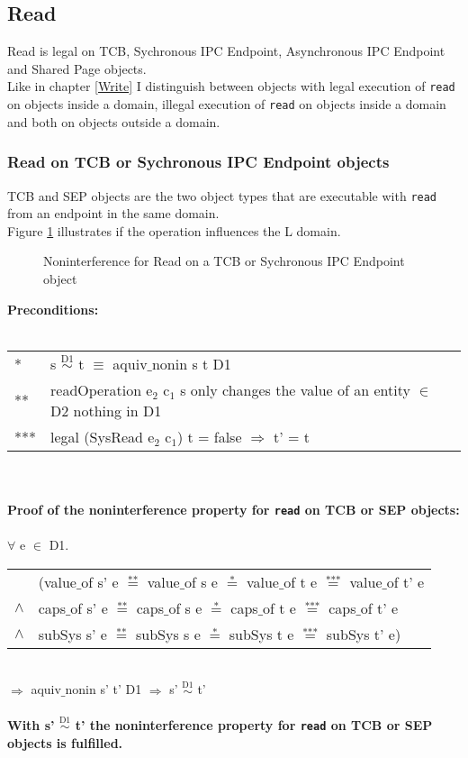 \subsection{Read}\label{sec:Read}
Read is legal on TCB, Sychronous IPC Endpoint, Asynchronous IPC Endpoint and Shared Page objects. \\
Like in chapter \ref{Write} I distinguish between objects with legal execution of \texttt{read} on objects inside a domain, illegal execution of \texttt{read} on objects inside a domain and both on objects outside a domain.
\subsubsection{Read on TCB or Sychronous IPC Endpoint objects}
TCB and SEP objects are the two object types that are executable with \texttt{read} from an endpoint in the same domain. \\
Figure \ref{fig:ReadTCB} illustrates if the operation influences the L domain.
\begin{flushleft}
\begin{figure}[H]
\caption{Noninterference for Read on a TCB or Sychronous IPC Endpoint object}
\label{fig:ReadTCB}
\end{figure}
\end{flushleft}
\textbf{Preconditions:} \\ \\
\begin{tabular}{ll}
* & s $\overset{\text{D1}}{\sim}$ t $\equiv$ aquiv$\_$nonin s t D1	\\ 
** & readOperation e$_2$ c$_1$ s only changes the value of an entity $\in$ D2 nothing in D1 \\ 
*** & legal (SysRead e$_2$ c$_1$) t = false $\Rightarrow$ t' = t
\end{tabular} \\ \\ 
\textbf{Proof of the noninterference property for \texttt{read} on TCB or SEP objects:}\\ \\
$\forall$ e $\in$ D1. \\ 
\begin{tabular}{ll}
& (value$\_$of s' e $\overset{\text{**}}{=}$ value$\_$of s e $\overset{\text{*}}{=}$ value$\_$of t e $\overset{\text{***}}{=}$ value$\_$of t' e \\
$\wedge$ & caps$\_$of s' e $\overset{\text{**}}{=}$ caps$\_$of s e $\overset{\text{*}}{=}$ caps$\_$of t e $\overset{\text{***}}{=}$ caps$\_$of t' e \\
$\wedge$ & subSys s' e $\overset{\text{**}}{=}$ subSys s e $\overset{\text{*}}{=}$ subSys t e $\overset{\text{***}}{=}$ subSys t' e)
\end{tabular} \\
$\Rightarrow$ aquiv$\_$nonin s' t' D1 $\Rightarrow$ s' $\overset{\text{D1}}{\sim}$ t' \\ \\
\textbf{With s' $\overset{\text{D1}}{\sim}$ t' the noninterference property for \texttt{read} on TCB or SEP objects is fulfilled.}  
\clearpage
